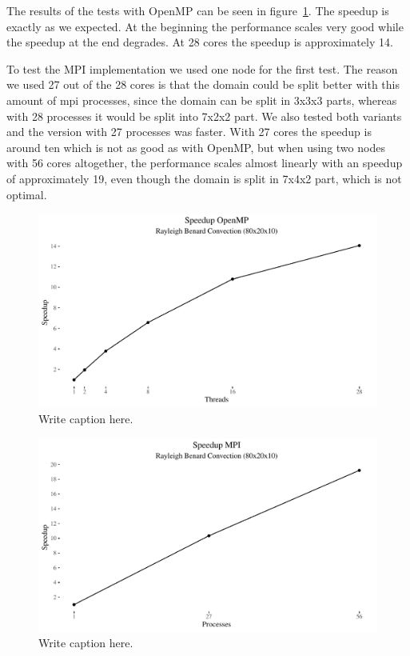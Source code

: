 \documentclass{article}%
\begin{document}
The results of the tests with OpenMP can be seen in figure~\ref{fig:speedup_openmp}. The speedup is exactly as we expected. At the beginning the performance scales very good while the speedup at the end degrades. At 28 cores the speedup is approximately 14.

To test the MPI implementation we used one node for the first test. The reason we used 27 out of the 28 cores is that the domain could be split better with this amount of mpi processes, since the domain can be split in 3x3x3 parts, whereas with 28 processes it would be split into 7x2x2 part. We also tested both variants and the version with 27 processes was faster. With 27 cores the speedup is around ten which is not as good as with OpenMP, but when using two nodes with 56 cores altogether, the performance scales almost linearly with an speedup of approximately 19, even though the domain is split in 7x4x2 part, which is not optimal.


\begin{figure}[htb]
\centering
\includegraphics[width=1\linewidth]{../tests/graphs/speedup_OpenMP_double.pdf}
\caption{Write caption here.}
\label{fig:speedup_openmp}
\end{figure}

\begin{figure}[htb]
\centering
\includegraphics[width=1\linewidth]{../tests/graphs/speedup_MPI.pdf}
\caption{Write caption here.}
\label{fig:speedup_MPI}
\end{figure}
\end{document}
